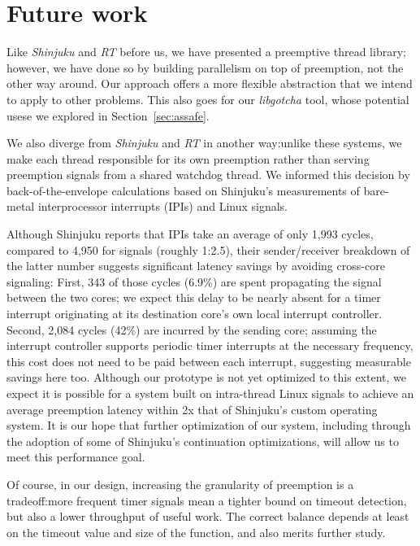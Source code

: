 \section{Future work}

Like \textit{Shinjuku} and \textit{RT} before us, we have presented a preemptive
thread library; however, we have done so by building parallelism on top of
preemption,
not the other way around.  Our approach offers a more flexible abstraction that
we intend to apply to other problems.  This also goes for our \textit{libgotcha}
tool, whose potential usese we explored in Section~\ref{sec:assafe}.


We also diverge from \textit{Shinjuku} and \textit{RT}
in another way:\@ unlike these systems, we make each thread responsible for
its own preemption rather than serving preemption signals from a shared watchdog
thread.  We informed this decision by back-of-the-envelope calculations based on
Shinjuku's measurements of bare-metal interprocessor
interrupts (IPIs) and Linux signals.

Although Shinjuku reports that IPIs take an average of only 1,993 cycles, compared to
4,950 for signals (roughly 1:2.5), their sender/receiver breakdown of the latter
number suggests significant latency savings by avoiding cross-core signaling:
First, 343 of those cycles (6.9\%) are spent propagating the signal between the two
cores; we expect this delay to be nearly absent for a timer interrupt originating at
its destination core's own local interrupt controller.  Second, 2,084 cycles (42\%)
are incurred by the sending core; assuming the interrupt controller supports
periodic timer interrupts at the necessary frequency, this cost does not need to be
paid between each interrupt, suggesting measurable savings here too.  Although
our prototype is not yet optimized to this extent, we expect it is possible for a
system built on intra-thread Linux signals to achieve an average preemption latency
within 2x that of Shinjuku's custom operating system.  It is our hope that further
optimization of our system, including through the adoption of some of Shinjuku's
continuation optimizations, will allow us to meet this performance goal.

Of course, in our design, increasing the granularity of preemption is a tradeoff:\@ more
frequent timer signals mean a tighter bound on timeout detection, but also a lower
throughput of useful work.  The correct balance depends at least on the
timeout value and size of the function, and also merits further study.


